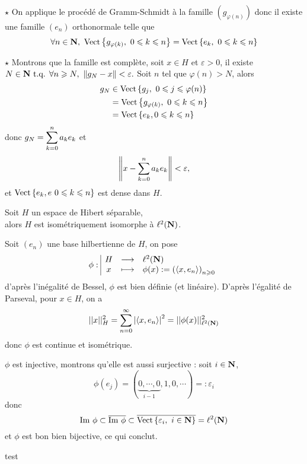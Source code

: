 \documentclass[a4paper,11pt, twoside]{article}
\begin{document}
\begin{Proof}
  $\star$ On applique le procédé de Gramm-Schmidt à la famille $(g_{\varphi(n)})$ donc il existe une famille $(e_n)$ orthonormale telle que 
  $$\forall n\in \N,\ \mathrm{Vect}\ens{g_{\varphi(k)},\ 0\leqslant k\leqslant n}= \mathrm{Vect}\ens{e_k,\ 0\leqslant k\leqslant n}$$

  $\star$ Montrons que la famille est complète, soit $x\in H$ et $\varepsilon>0$, il existe $N\in\N\tq \forall n\geqslant N,\ \norm{g_N-x}<\varepsilon.$ Soit $n$ tel que $\varphi(n)>N$, alors 
  \begin{align*}
    g_N&\in \mathrm{Vect}\left\{g_j,\ 0\leqslant j\leqslant \varphi(n)\right\}\\
    &= \mathrm{Vect}\left\{g_{\varphi(k)},\ 0\leqslant k\leqslant n\right\}\\
    &=\mathrm{Vect}\left\{e_k, 0\leqslant k\leqslant n\right\}
  \end{align*}
  donc $g_N=\displaystyle\sum_{k=0}^na_ke_k$ et 
  $$\left\lVert x-\sum_{k=0}^na_ke_k\right\rVert<\varepsilon,$$
  et $\mathrm{Vect}\left\{e_k,e\ 0\leqslant k\leqslant n\right\}$ est dense dans $H$.
\end{Proof}


\begin{Th}
  Soit $H$ un espace de Hibert séparable,\\

  alors $H$ est isométriquement isomorphe à $\ell^2(\mathbf N)$.
\end{Th}


\begin{Proof}
  Soit $(e_n)$ une base hilbertienne de $H$, on pose
  $$\phi:\begin{array}{|ccl}
    H&\longrightarrow&\ell^2(\mathbf N)\\
    x&\longmapsto&\phi(x):=\left(\left\langle x,e_n \right\rangle\right)_{n\geqslant 0}
  \end{array}$$
  d'après l'inégalité de Bessel, $\phi$ est bien définie (et linéaire).
  D'après l'égalité de Parseval, pour $x\in H$, on a
  $$||x||_{H}^2=\sum_{n=0}^\infty\left| \left\langle x,e_n \right\rangle\right|^2=||\phi(x)||_{\ell^2(\mathbf N)}^2$$
  donc $\phi$ est continue et isométrique.

  $\phi$ est injective, montrons qu'elle est aussi surjective : soit $i\in \mathbf N$, 
  $$\phi(e_j)=(\underbrace{0,\cdots,0}_{i-1},1,0,\cdots)=:\varepsilon_i$$
  donc 
  $$\mathrm{Im}\ \phi\subset\overline{\mathrm{Im}\ \phi}\subset\overline{\mathrm{Vect}\ens{\varepsilon_i,\ i\in\N}}=\ell^2(\N)$$
  et $\phi$ est bon bien bijective, ce qui conclut.
\end{Proof}{\color{white}test}\\[2em]
\end{document}
